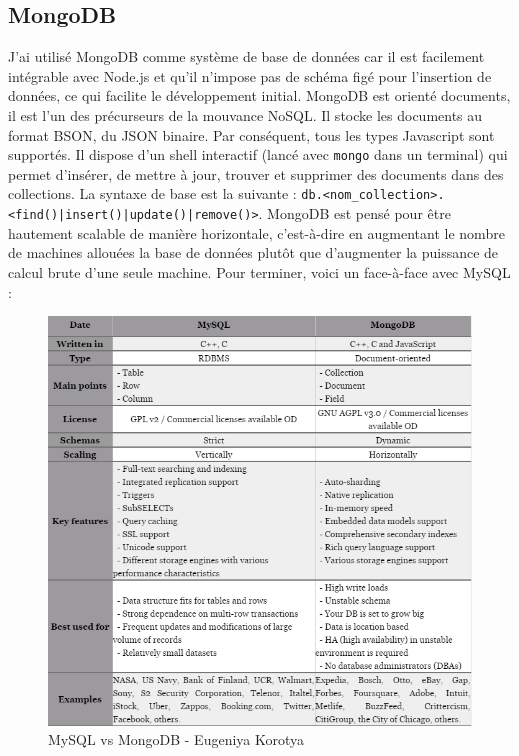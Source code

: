 \documentclass[a4paper, 12pt]{article}
\begin{document}
\subsection{MongoDB}
J'ai utilisé MongoDB comme système de base de données car il est facilement intégrable avec Node.js et qu'il n'impose 
pas de schéma figé pour l'insertion de données, ce qui facilite le développement initial. MongoDB est orienté documents, 
il est l'un des précurseurs de la mouvance NoSQL. Il stocke les documents au format BSON, du JSON binaire. Par conséquent, 
tous les types Javascript sont supportés. Il dispose d'un shell interactif (lancé avec \texttt{mongo} dans 
un terminal) qui permet d'insérer, de mettre à jour, trouver et supprimer des documents dans des collections. La syntaxe 
de base est la suivante : \texttt{db.<nom_collection>.<find()|insert()|update()|remove()>}. MongoDB est pensé 
pour être hautement scalable de manière horizontale, c'est-à-dire en augmentant le nombre de machines allouées la base de 
données plutôt que d'augmenter la puissance de calcul brute d'une seule machine. Pour terminer, voici un face-à-face avec MySQL :
\begin{figure}
    \begin{center}
        \includegraphics[width=1\textwidth]{images/mysql_mongodb.png}
    \end{center}
    \caption{MySQL vs MongoDB - Eugeniya Korotya \cite{ref160}}
\end{figure}
\end{document}

